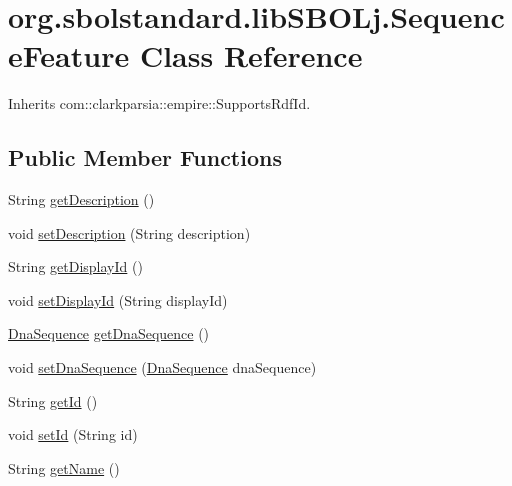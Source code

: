 \hypertarget{classorg_1_1sbolstandard_1_1lib_s_b_o_lj_1_1_sequence_feature}{
\section{org.sbolstandard.libSBOLj.SequenceFeature Class Reference}
\label{classorg_1_1sbolstandard_1_1lib_s_b_o_lj_1_1_sequence_feature}
}


Inherits com::clarkparsia::empire::SupportsRdfId.

\subsection*{Public Member Functions}
\begin{DoxyCompactItemize}
\item 
String \hyperlink{classorg_1_1sbolstandard_1_1lib_s_b_o_lj_1_1_sequence_feature_acc578293c55c6e370320bbdccd61f197}{getDescription} ()
\item 
void \hyperlink{classorg_1_1sbolstandard_1_1lib_s_b_o_lj_1_1_sequence_feature_a2c512fe7b7150f42cd0c9adceaadf63f}{setDescription} (String description)
\item 
String \hyperlink{classorg_1_1sbolstandard_1_1lib_s_b_o_lj_1_1_sequence_feature_a20b5f8fbb51b1d3218571cd26143c8ec}{getDisplayId} ()
\item 
void \hyperlink{classorg_1_1sbolstandard_1_1lib_s_b_o_lj_1_1_sequence_feature_a965b4e95b4a3eea88406a0702a7948f2}{setDisplayId} (String displayId)
\item 
\hyperlink{classorg_1_1sbolstandard_1_1lib_s_b_o_lj_1_1_dna_sequence}{DnaSequence} \hyperlink{classorg_1_1sbolstandard_1_1lib_s_b_o_lj_1_1_sequence_feature_a75889c84432582829189e4ef3f0014b0}{getDnaSequence} ()
\item 
void \hyperlink{classorg_1_1sbolstandard_1_1lib_s_b_o_lj_1_1_sequence_feature_a3ceac5c54d86a162d09597b1a540a1ba}{setDnaSequence} (\hyperlink{classorg_1_1sbolstandard_1_1lib_s_b_o_lj_1_1_dna_sequence}{DnaSequence} dnaSequence)
\item 
String \hyperlink{classorg_1_1sbolstandard_1_1lib_s_b_o_lj_1_1_sequence_feature_a29ca06f6fde9a995e10bf2afd2a5d1db}{getId} ()
\item 
void \hyperlink{classorg_1_1sbolstandard_1_1lib_s_b_o_lj_1_1_sequence_feature_a0e0068a7ce35f6b38c7a725fd4cabd3b}{setId} (String id)
\item 
String \hyperlink{classorg_1_1sbolstandard_1_1lib_s_b_o_lj_1_1_sequence_feature_ace428bc10a1bead3d0ae68d9ee926c78}{getName} ()

\end{DoxyCompactItemize}
